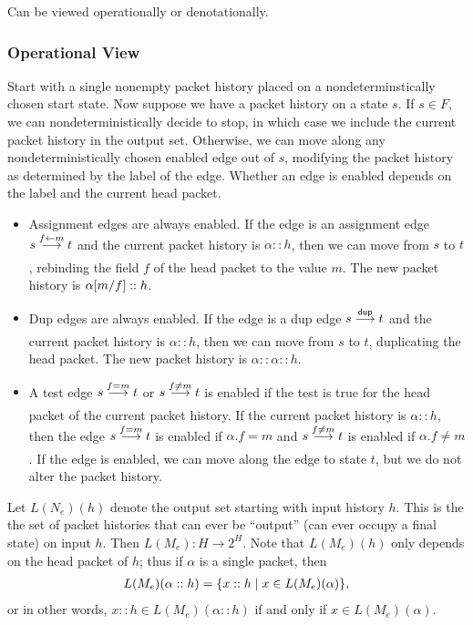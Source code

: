 \documentclass{article}
\newcommand\pdup{\mathop{\mathsf{dup}}}
\renewcommand\powerset[1]{2^{#1}}
\begin{document}
Can be viewed operationally or denotationally.

\subsubsection*{Operational View}

Start with a single nonempty packet history placed on a nondeterminstically chosen start state. Now suppose we have a packet history on a state $s$. If $s\in F$, we can nondeterministically decide to stop, in which case we include the current packet history in the output set. Otherwise, we can move along any nondeterministically chosen enabled edge out of $s$, modifying the packet history as determined by the label of the edge. Whether an edge is enabled depends on the label and the current head packet.
\begin{itemize}
\item
Assignment edges are always enabled. If the edge is an assignment edge $s\underset{}{\overset{f\leftarrow m}\longrightarrow}t$ and the current packet history is $\alpha::h$, then we can move from $s$ to $t$, rebinding the field $f$ of the head packet to the value $m$. The new packet history is $\alpha[m/f]::h$.
\item
Dup edges are always enabled. If the edge is a dup edge $s\goesto{\pdup}{}t$ and the current packet history is
$\alpha::h$, then we can move from $s$ to $t$, duplicating the head packet. The new packet history is $\alpha::\alpha::h$.
\item
A test edge $s\underset{}{\overset{f=m}\longrightarrow}t$ or $s\underset{}{\overset{f\neq m}\longrightarrow}t$ is enabled if the test is true for the head packet of the current packet history. If the current packet history is $\alpha::h$, then the edge $s\underset{}{\overset{f=m}\longrightarrow}t$ is enabled if $\alpha.f=m$ and $s\underset{}{\overset{f\neq m}\longrightarrow}t$ is enabled if $\alpha.f\neq m$. If the edge is enabled, we can move along the edge to state $t$, but we do not alter the packet history.
\end{itemize}
Let $L(N_e)(h)$ denote the output set starting with input history $h$. This is the the set of packet histories that can ever be ``output'' (can ever occupy a final state) on input $h$. Then $L(M_e):H\to\powerset H$. Note that $L(M_e)(h)$ only depends on the head packet of $h$; thus if $\alpha$ is a single packet, then
\begin{align*}
L(M_e)(\alpha::h) = \{x::h \mid x\in L(M_e)(\alpha)\},
\end{align*}
or in other words, $x::h\in L(M_e)(\alpha::h)$ if and only if $x\in L(M_e)(\alpha)$.
\end{document}
